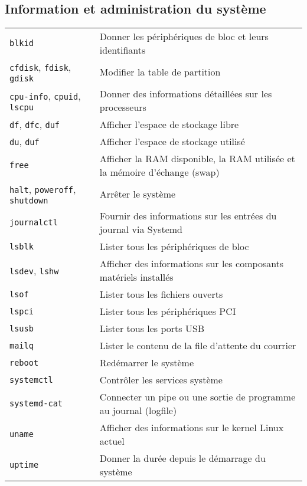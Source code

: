\documentclass[10pt,a4paper]{article}
\begin{document}
\cheatsheet

\begin{multicols}{2}

\section{Information et administration du système}
\begin{tabular}{ p{2.5cm} p{8.5cm} }
  \hline
  \texttt{blkid} & Donner les périphériques de bloc et leurs identifiants\\
  \texttt{cfdisk}, \texttt{fdisk}, \texttt{gdisk} & Modifier la table de partition \\
  \texttt{cpu-info}, \texttt{cpuid}, \texttt{lscpu} & Donner des informations détaillées sur les processeurs \\
  \texttt{df}, \texttt{dfc}, \texttt{duf} & Afficher l'espace de stockage libre \\
  \texttt{du}, \texttt{duf} & Afficher l'espace de stockage utilisé \\
  \texttt{free} & Afficher la RAM disponible, la RAM utilisée et la mémoire d'échange (swap)\\
  \texttt{halt}, \texttt{poweroff}, \texttt{shutdown} & Arrêter le système\\
  \texttt{journalctl} & Fournir des informations sur les entrées du journal via Systemd \\
  \texttt{lsblk} & Lister tous les périphériques de bloc\\
  \texttt{lsdev}, \texttt{lshw} & Afficher des informations sur les composants matériels installés\\
  \texttt{lsof} & Lister tous les fichiers ouverts\\
  \texttt{lspci} & Lister tous les périphériques PCI\\
  \texttt{lsusb} & Lister tous les ports USB\\
  \texttt{mailq} & Lister le contenu de la file d'attente du courrier\\
  \texttt{reboot} & Redémarrer le système\\
  \texttt{systemctl} & Contrôler les services système \\
  \texttt{systemd-cat} & Connecter un pipe ou une sortie de programme au journal (logfile)\\
  \texttt{uname} & Afficher des informations sur le kernel Linux actuel\\
  \texttt{uptime} & Donner la durée depuis le démarrage du système\\
  \hline
\end{tabular}


\end{multicols}
\end{document}
